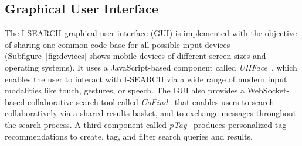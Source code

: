 \documentclass{acm_proc_article-sp}
\let\oldemph\emph
\renewcommand{\emph}[1]{\oldemph{\fontsize{9}{9}\selectfont #1}}
\begin{document}
\subsection{Graphical User Interface}
The \mbox{I-SEARCH} graphical user interface (GUI) is implemented with the objective of sharing one common code base for all possible input devices (Subfigure~\ref{fig:devices} shows mobile devices of different screen sizes and operating systems).
It uses a JavaScript-based component called \emph{UIIFace}~\cite{mmm2012}, which enables the user to interact with \mbox{I-SEARCH} via a wide range of modern input modalities like touch, gestures, or speech.
The GUI also provides a WebSocket-based collaborative search tool called \emph{CoFind}~\cite{mmm2012} that enables users to search collaboratively via a shared results basket, and to exchange messages throughout the search process.
A third component called \emph{pTag}~\cite{mmm2012} produces personalized tag recommendations to create, tag, and filter search queries and results.
\end{document}
